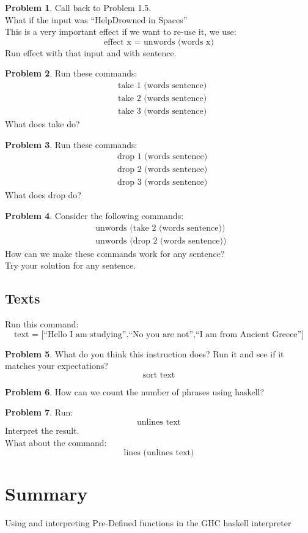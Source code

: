 \documentclass[a4paper,10pt]{article}
\theoremstyle{definition}
\newtheorem{problem}{Problem}[section]
\begin{document}
\begin{problem}
    Call back to Problem 1.5. \hfill \\
    What if the input was ``\hspace{1cm}Help\hspace{2cm}Drowned in\hspace{1cm} Spaces''
    \hfill\\This is a very important effect if we want to re-use it, we use:
    \[\text{effect x = unwords (words x)}\]
    Run effect with that input and with sentence.
\end{problem}
\begin{problem}
    Run these commands:
    \begin{align*}
        &\text{take 1 (words sentence)}\\
        &\text{take 2 (words sentence)}\\
        &\text{take 3 (words sentence)}
    \end{align*}
    What does take do?
\end{problem}
\begin{problem}
    Run these commands:
    \begin{align*}
        &\text{drop 1 (words sentence)}\\
        &\text{drop 2 (words sentence)}\\
        &\text{drop 3 (words sentence)}
    \end{align*}
    What does drop do?
\end{problem}
\begin{problem}
    Consider the following commands:
    \begin{align*}
        &\text{unwords (take 2 (words sentence)) }\\
        &\text{unwords (drop 2 (words sentence)) }
    \end{align*}
    How can we make these commands work for any sentence?\hfill\\
    Try your solution for any sentence.
\end{problem}
\subsection*{Texts}
Run this command:
\[\text{text = [``Hello I am studying'',``No you are not'',``I am from Ancient Greece'']}\]
\begin{problem}
What do you think this instruction does? Run it and see if it matches your expectations?
\[\text{sort text}\]
\end{problem}
\begin{problem}
    How can we count the number of phrases using haskell?
\end{problem}
\begin{problem}
    Run:
    \[\text{unlines text}\]
    Interpret the result.\hfill\\
    What about the command:
    \[\text{lines (unlines text)}\]
\end{problem}
\newpage

\section{Summary}
Using and interpreting Pre-Defined functions in the GHC haskell interpreter
\end{document}
